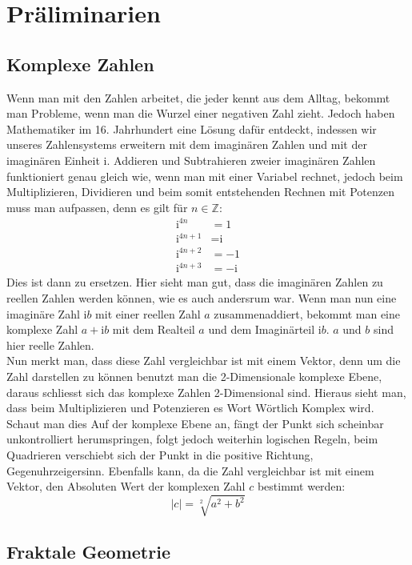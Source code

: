 \section{Präliminarien}
\subsection{Komplexe Zahlen}
Wenn man mit den Zahlen arbeitet, die jeder kennt aus dem Alltag, bekommt man Probleme, wenn man die Wurzel einer negativen Zahl zieht. Jedoch haben Mathematiker im 16. Jahrhundert eine Lösung dafür entdeckt, indessen wir unseres Zahlensystems erweitern mit dem imaginären Zahlen und mit der imaginären Einheit i. Addieren und Subtrahieren zweier imaginären Zahlen funktioniert genau gleich wie, wenn man mit einer Variabel rechnet, jedoch beim Multiplizieren, Dividieren und beim somit entstehenden Rechnen mit Potenzen muss man aufpassen, denn es gilt für $n \in \mathbb{Z}$:
\begin{align*}
 \text{i}^{4n} &= 1 \\
\text{i}^{4n+1} &= \text{i} \\
\text{i}^{4n+2} &= -1 \\
\text{i}^{4n+3} &= -\text{i} 
\end{align*}
Dies ist dann zu ersetzen. Hier sieht man gut, dass die imaginären Zahlen zu reellen Zahlen werden können, wie es auch andersrum war. Wenn man nun eine imaginäre Zahl $\text{i}b$ mit einer reellen Zahl $a$ zusammenaddiert, bekommt man eine komplexe Zahl  $a+\text{i}b$ mit dem Realteil $a$ und dem Imaginärteil $\text{i}b$. $a$ und $b$ sind hier reelle Zahlen.
\\
Nun merkt man, dass diese Zahl vergleichbar ist mit einem Vektor, denn um die Zahl darstellen zu können benutzt man die 2-Dimensionale komplexe Ebene, daraus schliesst sich das komplexe Zahlen 2-Dimensional sind. Hieraus sieht man, dass beim Multiplizieren und Potenzieren es Wort Wörtlich Komplex wird. Schaut man dies Auf der komplexe Ebene an, fängt der Punkt sich scheinbar unkontrolliert herumspringen, folgt jedoch weiterhin logischen Regeln, beim Quadrieren verschiebt sich der Punkt in die positive Richtung, Gegenuhrzeigersinn. Ebenfalls kann, da die Zahl vergleichbar ist mit einem Vektor, den Absoluten Wert der komplexen Zahl $c$ bestimmt  werden:
\[|c| = \sqrt[2]{a^2+b^2} \]

\subsection{Fraktale Geometrie}
